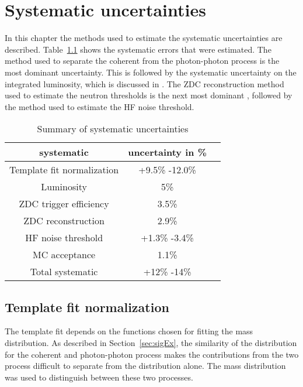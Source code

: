 \chapter{\label{sec:sysCheck}Systematic uncertainties}
  In this chapter the methods used to estimate the systematic 
    uncertainties are described. 
  Table~\ref{tab:sumsyst} shows the systematic errors that were estimated.
  The method used to separate the coherent from the photon-photon process 
   is the most dominant uncertainty.
  This is followed by the systematic uncertainty on the integrated luminosity,
    which is discussed in \cite{cmsLumi}.
  The ZDC reconstruction method used to estimate the neutron thresholds 
    is the next most dominant \DIFaddbegin {}\DIFaddend , followed by the method used to 
    estimate the HF noise threshold. 
  \begin{table}[!Hhtb]
    \begin{center}
      \begin{tabular}{|c|c|c|}
        \hline
        systematic & uncertainty in \%  \\ \hline
        Template fit normalization & +9.5\% -12.0\% \\ \hline
        Luminosity & 5\% \\ \hline
        ZDC trigger efficiency & 3.5\%    \\ \hline
        ZDC reconstruction  & 2.9\%  \\ \hline
        HF noise threshold & +1.3\% -3.4\% \\ \hline 
        MC acceptance & 1.1\% \\ \hline
        \hline \hline
        Total systematic & +12\% -14\% \\ \hline
      \end{tabular}
      \caption{Summary of systematic uncertainties}
      \label{tab:sumsyst}
    \end{center}
  \end{table}

  \section{Template fit normalization}
    The \pt{} template fit depends on the functions chosen for fitting
      the mass distribution.
    As described in Section~\ref{sec:sigEx}, the similarity of the 
      \pt{} distribution for the coherent and photon-photon process makes
      the contributions from the two process difficult to separate from the 
      \pt{} distribution alone.
    The mass distribution was used to distinguish between these two processes.

